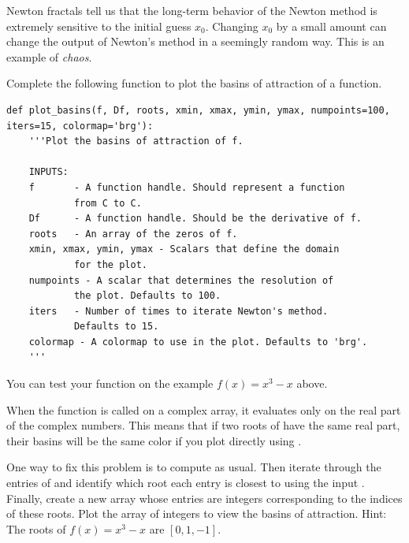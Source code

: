 Newton fractals tell us that the long-term behavior of the Newton method is extremely sensitive to the initial guess $x_0$.
Changing $x_0$ by a small amount can change the output of Newton's method in a seemingly random way.
This is an example of \emph{chaos}.





\begin{problem}
\leavevmode

Complete the following function to plot the basins of attraction of a function.
\begin{lstlisting}
def plot_basins(f, Df, roots, xmin, xmax, ymin, ymax, numpoints=100, iters=15, colormap='brg'):
    '''Plot the basins of attraction of f.
    
    INPUTS:
    f       - A function handle. Should represent a function 
            from C to C.
    Df      - A function handle. Should be the derivative of f.
    roots   - An array of the zeros of f.
    xmin, xmax, ymin, ymax - Scalars that define the domain 
            for the plot.
    numpoints - A scalar that determines the resolution of 
            the plot. Defaults to 100.
    iters   - Number of times to iterate Newton's method. 
            Defaults to 15.
    colormap - A colormap to use in the plot. Defaults to 'brg'.    
    '''
\end{lstlisting}
You can test your function on the example $f(x) = x^3-x$ above. 

When the function  is called on a complex array, it evaluates only on the real part of the complex numbers.
This means that if two roots of  have the same real part, their basins will be the same color if you plot directly using .

One way to fix this problem is to compute  as usual.
Then iterate through the entries of  and identify which root each entry is closest to using the input .
Finally, create a new array whose entries are integers corresponding to the indices of these roots.
Plot the array of integers to view the basins of attraction.  Hint: The roots of $f(x) = x^3-x$ are $[0,1,-1]$.
\end{problem}

